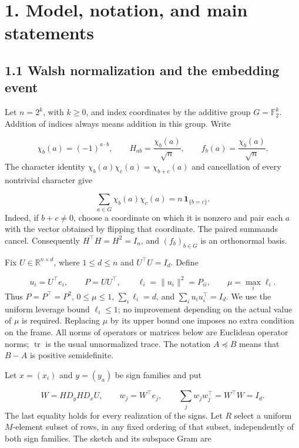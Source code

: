 \documentclass[11pt,a4paper]{article}
\begin{document}
\section*{1. Model, notation, and main statements}
\subsection*{1.1 Walsh normalization and the embedding event}
Let \(n=2^k\), with \(k\ge0\), and index coordinates by the additive group \(G=\mathbb F_2^k\). Addition of indices always means addition in this group. Write

\begin{equation}
\chi_b(a)=(-1)^{a\cdot b},\qquad
H_{ab}=\frac{\chi_b(a)}{\sqrt n},\qquad
f_b(a)=\frac{\chi_b(a)}{\sqrt n}.
\tag{1.1}
\end{equation}
The character identity \(\chi_b(a)\chi_c(a)=\chi_{b+c}(a)\) and cancellation of every nontrivial character give

\begin{equation}
\sum_{a\in G}\chi_b(a)\chi_c(a)=n\,\mathbf1_{\{b=c\}}.
\tag{1.2}
\end{equation}
Indeed, if \(b+c\ne0\), choose a coordinate on which it is nonzero and pair each \(a\) with the vector obtained by flipping that coordinate. The paired summands cancel. Consequently \(H^\top H=H^2=I_n\), and \((f_b)_{b\in G}\) is an orthonormal basis.

Fix \(U\in\mathbb R^{n\times d}\), where \(1\le d\le n\) and \(U^\top U=I_d\). Define

\begin{equation}
u_i=U^\top e_i,\qquad P=UU^\top,\qquad
\ell_i=\|u_i\|^2=P_{ii},\qquad
\mu=\max_i\ell_i .
\tag{1.3}
\end{equation}
Thus \(P=P^\top=P^2\), \(0\le\mu\le1\), \(\sum_i\ell_i=d\), and \(\sum_i u_i u_i^\top=I_d\). We use the uniform leverage bound \(\ell_i\le1\); no improvement depending on the actual value of \(\mu\) is required. Replacing \(\mu\) by its upper bound one imposes no extra condition on the frame. All norms of operators or matrices below are Euclidean operator norms; \(\operatorname{tr}\) is the usual unnormalized trace. The notation \(A\preceq B\) means that \(B-A\) is positive semidefinite.

Let \(x=(x_i)\) and \(y=(y_a)\) be sign families and put

\begin{equation}
W=HD_yHD_xU,\qquad w_j=W^\top e_j,\qquad
\sum_j w_jw_j^\top=W^\top W=I_d .
\tag{1.4}
\end{equation}
The last equality holds for every realization of the signs. Let \(R\) select a uniform \(M\)-element subset of rows, in any fixed ordering of that subset, independently of both sign families. The sketch and its subspace Gram are
\end{document}
